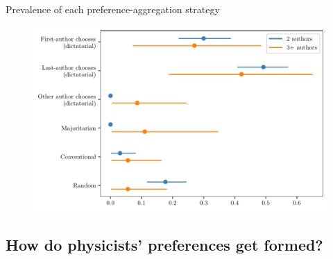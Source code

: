 \documentclass[10pt]{beamer}
\begin{document}
\begin{frame}{Prevalence of each preference-aggregation strategy}
    
    \begin{figure}
        \centering
        \includegraphics[width=0.8\linewidth]{aggregation.pdf}
    \end{figure}
\end{frame}

\subsection{How do physicists' preferences get formed?}
\end{document}
